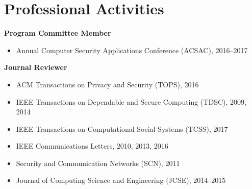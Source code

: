 \section*{Professional Activities}
\begin{description}
\item {\bf Program Committee Member}
  \begin{itemize}
  \item Annual Computer Security Applications Conference (ACSAC), 
    2016--2017
  \end{itemize}

\item {\bf Journal Reviewer}
  \begin{itemize}
  \item ACM Transactions on Privacy and Security (TOPS),
    2016
  \item IEEE Transactions on Dependable and Secure Computing (TDSC),
    2009, 2014
  \item IEEE Transactions on Computational Social Systems (TCSS),
    2017
  \item IEEE Communications Letters,
    2010, 2013, 2016
  \item Security and Communication Networks (SCN),
    2011
  \item Journal of Computing Science and Engineering (JCSE),
    2014--2015
  \end{itemize}

\end{description}

